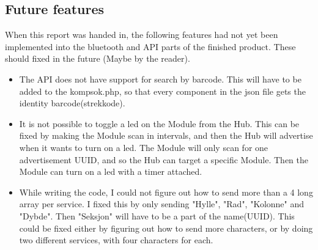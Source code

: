 \subsection{Future features}
When this report was handed in, the following features had not yet been implemented into the bluetooth and API parts of the finished product. These should fixed in the future (Maybe by the reader).
\begin{itemize}
    \item The API does not have support for search by barcode. This will have to be added to the kompsok.php, so that every component in the json file gets the identity barcode(strekkode).
    \item It is not possible to toggle a led on the Module from the Hub. This can be fixed by making the Module scan in intervals, and then the Hub will advertise when it wants to turn on a led. The Module will only scan for one advertisement UUID, and so the Hub can target a specific Module. Then the Module can turn on a led with a timer attached.
    \item While writing the code, I could not figure out how to send more than a 4 long array per service. I fixed this by only sending "Hylle", "Rad", "Kolonne" and "Dybde". Then "Seksjon" will have to be a part of the name(UUID). This could be fixed either by figuring out how to send more characters, or by doing two different services, with four characters for each. 
\end{itemize}